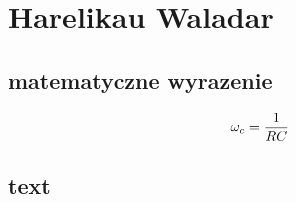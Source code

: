 

\newpage
\section{Harelikau Waladar}
\label{sec:text_vharelikau}

\subsection{matematyczne wyrazenie}
    \begin{equation}
              \omega_c = \frac{1}{RC}\\
    \end{equation}

\subsection{text}
